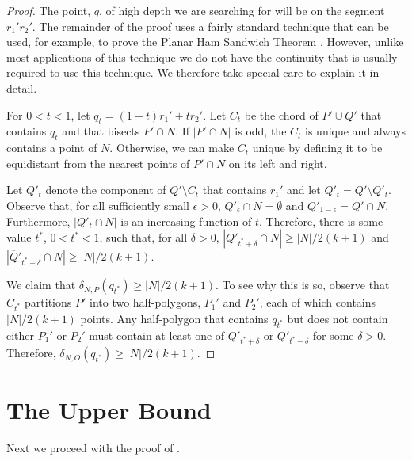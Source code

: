 \documentclass{article}
\begin{document}
\begin{proof}
The point, $q$, of high depth we are searching for will be on the
segment $r_1'r_2'$. The remainder of the proof uses a fairly standard
technique that can be used, for example, to prove the Planar Ham
Sandwich Theorem \cite{m03}. However, unlike most applications of this
technique we do not have the continuity that is usually required to
use this technique.  We therefore take special care to explain it in
detail.
 
For $0< t< 1$, let $q_t = (1-t)r_1'+ tr_2'$.  Let $C_t$ be the chord of
$P'\cup Q'$ that contains $q_t$ and that bisects $P'\cap N$.  If
$|P'\cap N|$ is odd, the $C_t$ is unique and always contains a point
of $N$.  Otherwise, we can make $C_t$ unique by defining it to be
equidistant from the nearest points of $P'\cap N$ on its left and
right.

Let $Q'_t$ denote the component of $Q'\setminus C_t$ that contains
$r_1'$ and let $\overline{Q}'_t = Q'\setminus Q'_t$.
Observe that, for all sufficiently small $\epsilon > 0$, $Q'_\epsilon\cap
N=\emptyset$ and $Q'_{1-\epsilon} = Q'\cap N$.  Furthermore, $|Q'_t\cap N|$
is an increasing function of $t$.
Therefore, there is some value $t^*$, $0 < t^* < 1$, such that, for
all $\delta > 0$, 
$|Q'_{t^*+\delta}\cap N|\ge |N|/2(k+1)$ and 
$|\overline{Q}'_{t^*-\delta}\cap N|\ge |N|/2(k+1)$.

We claim that $\delta_{N,P}(q_{t^*}) \ge |N|/2(k+1)$.   To see
why this is so, observe that $C_{t^*}$ partitions $P'$ into two
half-polygons, $P_1'$ and $P_2'$, each of which contains $|N|/2(k+1)$
points.  Any half-polygon that contains $q_{t^*}$ but does not contain
either $P_1'$ or $P_2'$ must contain at least one of 
$Q'_{t^*+\delta}$ or 
$\overline{Q}'_{t^*-\delta}$ for some $\delta > 0$.
Therefore, $\delta_{N,O}(q_{t^*}) \ge |N|/2(k+1)$.
\end{proof}

\section{The Upper Bound}

Next we proceed with the proof of .
\end{document}
